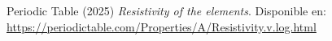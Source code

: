 \begin{thebibliography}{3}

     Periodic Table (2025) \textit{Resistivity of the elements}.
    Disponible en: \url{https://periodictable.com/Properties/A/Resistivity.v.log.html}
\end{thebibliography}


